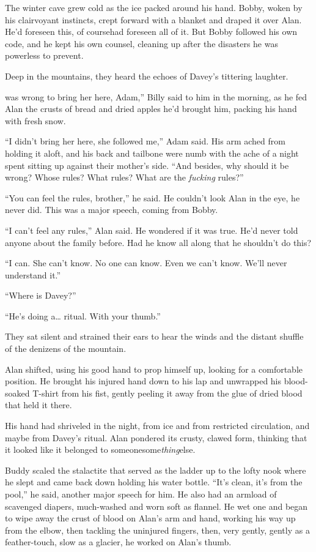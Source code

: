 The winter cave grew cold as the ice packed around his hand.  Bobby,
woken by his clairvoyant instincts, crept forward with a blanket and
draped it over Alan.  He'd foreseen this, of course\dash{}had foreseen all
of it.  But Bobby followed his own code, and he kept his own counsel,
cleaning up after the disasters he was powerless to prevent.

Deep in the mountains, they heard the echoes of Davey's tittering
laughter.

was wrong to bring her here, Adam,'' Billy said to him in the
morning, as he fed Alan the crusts of bread and dried apples he'd
brought him, packing his hand with fresh snow.

``I didn't bring her here, she followed me,'' Adam said.  His arm
ached from holding it aloft, and his back and tailbone were numb with
the ache of a night spent sitting up against their mother's side. 
``And besides, why should it be wrong?  Whose rules?  What rules? 
What are the \textit{fucking} rules?''

``You can feel the rules, brother,'' he said.  He couldn't look Alan
in the eye, he never did.  This was a major speech, coming from Bobby.

``I can't feel any rules,'' Alan said.  He wondered if it was true. 
He'd never told anyone about the family before.  Had he know all along
that he shouldn't do this?

``I can.  She can't know.  No one can know.  Even we can't know. 
We'll never understand it.''

``Where is Davey?''

``He's doing a\ldots{}  ritual.  With your thumb.''

They sat silent and strained their ears to hear the winds and the
distant shuffle of the denizens of the mountain.

Alan shifted, using his good hand to prop himself up, looking for a
comfortable position.  He brought his injured hand down to his lap and
unwrapped his blood-soaked T-shirt from his fist, gently peeling it
away from the glue of dried blood that held it there.

His hand had shriveled in the night, from ice and from restricted
circulation, and maybe from Davey's ritual.  Alan pondered its crusty,
clawed form, thinking that it looked like it belonged to
someone\dash{}some\textit{thing}\dash{}else.

Buddy scaled the stalactite that served as the ladder up to the lofty
nook where he slept and came back down holding his water bottle. 
``It's clean, it's from the pool,'' he said, another major speech for
him.  He also had an armload of scavenged diapers, much-washed and
worn soft as flannel.  He wet one and began to wipe away the crust of
blood on Alan's arm and hand, working his way up from the elbow, then
tackling the uninjured fingers, then, very gently, gently as a
feather-touch, slow as a glacier, he worked on Alan's thumb.

